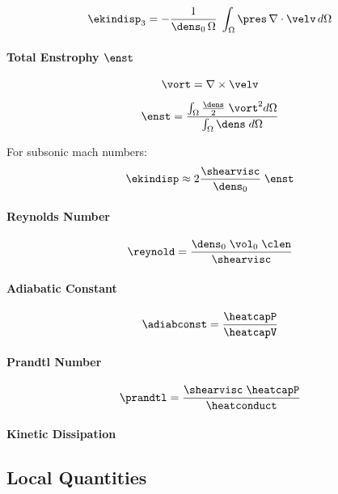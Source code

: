 \begin{equation}
\label{eq:ekindisp3}
    \ekindisp_3 = -\frac{1}{\dens_0\,\Omega} \; \int_\Omega \pres \, \nabla \cdot \velv \, d\Omega
\end{equation}

\paragraph{Total Enstrophy $\enst$}

\begin{equation}
\label{eq:vort}
    \vort = \nabla \times \velv
\end{equation}

\begin{equation}
\label{eq:enst}
    \enst = \frac{\int_\Omega \frac{\dens}{2} \; \vort^2 d\Omega}{\int_\Omega \dens \; d\Omega}
\end{equation}

For subsonic mach numbers:
\begin{equation}
\label{eq:ekindisp2}
    \ekindisp \approx 2 \frac{\shearvisc}{\dens_0} \; \enst
\end{equation}

\paragraph{Reynolds Number}

\begin{equation}
\label{eq:reynold}
    \reynold = \frac{\dens_0\;\vol_0\;\clen}{\shearvisc}
\end{equation}

\paragraph{Adiabatic Constant}
\begin{equation}
\label{eq:adiabconst}
    \adiabconst = \frac{\heatcapP}{\heatcapV}
\end{equation}

\paragraph{Prandtl Number}
\begin{equation}
\label{eq:prandtl}
    \prandtl = \frac{\shearvisc \; \heatcapP}{\heatconduct}
\end{equation}

\paragraph{Kinetic Dissipation}
\subsection{Local Quantities}
